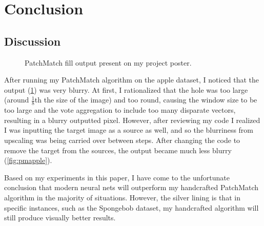 \section{Conclusion}
\subsection*{Discussion}
\begin{figure}
\centering
{}
\caption{PatchMatch fill output present on my project poster.}
\label{fig:blur}
\end{figure}

After running my PatchMatch algorithm on the apple dataset, I noticed that the output (\ref{fig:blur}) was very blurry. At first, I rationalized that the hole was too large (around $\frac 18$th the size of the image) and too round, causing the window size to be too large and the vote aggregation to include too many disparate vectors, resulting in a blurry outputted pixel. However, after reviewing my code I realized I was inputting the target image as a source as well, and so the blurriness from upscaling was being carried over between steps. After changing the code to remove the target from the sources, the output became much less blurry (\ref{fig:pmapple}).

Based on my experiments in this paper, I have come to the unfortunate conclusion that modern neural nets will outperform my handcrafted PatchMatch algorithm in the majority of situations. However, the silver lining is that in specific instances, such as the Spongebob dataset, my handcrafted algorithm will still produce visually better results.

